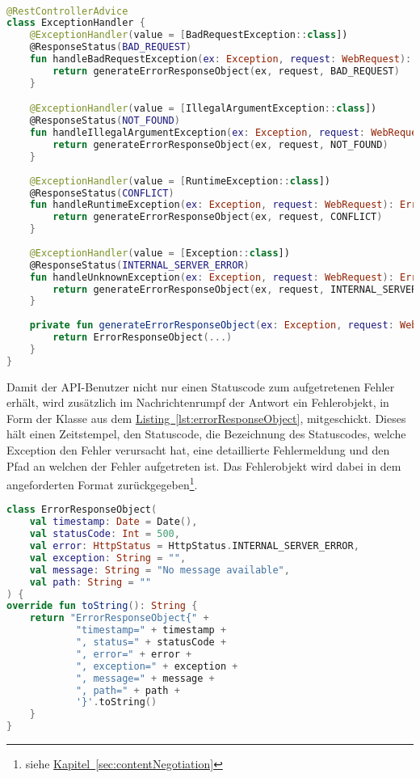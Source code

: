 \\
\begin{lstlisting}[style=lstStyleFramed, language=Kotlin, caption={Spring-Konfiguration des Exceptionhandling}, label=lst:springExceptionHandling, float]
@RestControllerAdvice
class ExceptionHandler {
	@ExceptionHandler(value = [BadRequestException::class])
	@ResponseStatus(BAD_REQUEST)
	fun handleBadRequestException(ex: Exception, request: WebRequest): ErrorResponseObject {
		return generateErrorResponseObject(ex, request, BAD_REQUEST)
	}

	@ExceptionHandler(value = [IllegalArgumentException::class])
	@ResponseStatus(NOT_FOUND)
	fun handleIllegalArgumentException(ex: Exception, request: WebRequest): ErrorResponseObject {
		return generateErrorResponseObject(ex, request, NOT_FOUND)
	}
	
	@ExceptionHandler(value = [RuntimeException::class])
	@ResponseStatus(CONFLICT)
	fun handleRuntimeException(ex: Exception, request: WebRequest): ErrorResponseObject {
		return generateErrorResponseObject(ex, request, CONFLICT)
	}
	
	@ExceptionHandler(value = [Exception::class])
	@ResponseStatus(INTERNAL_SERVER_ERROR)
	fun handleUnknownException(ex: Exception, request: WebRequest): ErrorResponseObject {
		return generateErrorResponseObject(ex, request, INTERNAL_SERVER_ERROR)
	}
	
	private fun generateErrorResponseObject(ex: Exception, request: WebRequest, statusCode: HttpStatus): ErrorResponseObject {
		return ErrorResponseObject(...)
	}
}
\end{lstlisting}
Damit der \gls{API}-Benutzer nicht nur einen Statuscode zum aufgetretenen Fehler erhält, wird zusätzlich im Nachrichtenrumpf der Antwort ein Fehlerobjekt, in Form der Klasse  aus dem \hyperref[lst:errorResponseObject]{Listing~\ref{lst:errorResponseObject}}, mitgeschickt. Dieses hält einen Zeitstempel, den Statuscode, die Bezeichnung des Statuscodes, welche Exception den Fehler verursacht hat, eine detaillierte Fehlermeldung und den Pfad an welchen der Fehler aufgetreten ist. Das Fehlerobjekt wird dabei in dem angeforderten Format zurückgegeben\footnote{siehe \hyperref[sec:contentNegotiation]{Kapitel~\ref{sec:contentNegotiation}}}.
\begin{lstlisting}[style=lstStyleFramed, language=Kotlin, caption={Spring-Konfiguration des Exceptionhandling}, label=lst:errorResponseObject, float]
class ErrorResponseObject(
	val timestamp: Date = Date(),
	val statusCode: Int = 500,
	val error: HttpStatus = HttpStatus.INTERNAL_SERVER_ERROR,
	val exception: String = "",
	val message: String = "No message available",
	val path: String = ""
) {
override fun toString(): String {
	return "ErrorResponseObject{" +
			"timestamp=" + timestamp +
			", status=" + statusCode +
			", error=" + error +
			", exception=" + exception +
			", message=" + message +
			", path=" + path +
			'}'.toString()
	}
}
\end{lstlisting}

